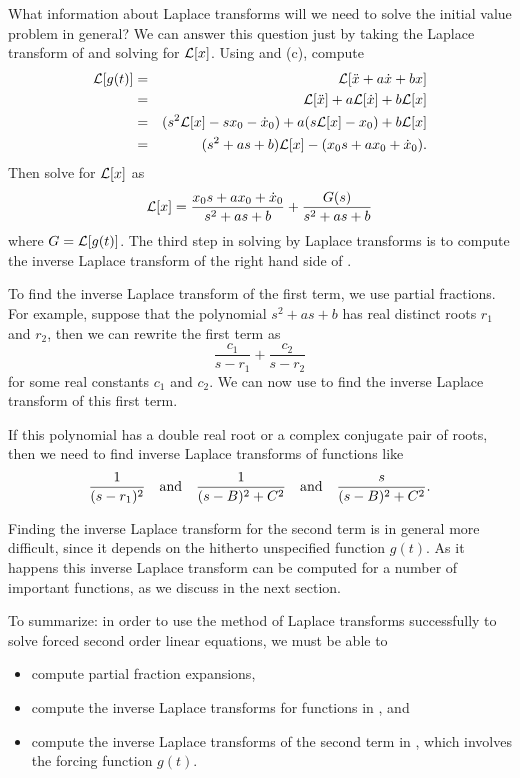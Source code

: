 \documentclass{ximera}
\begin{document}
What information about Laplace transforms will we need to solve the 
initial value problem  in general?  We can answer this 
question just by taking the Laplace transform of  and 
solving for ${\cal L}[x]$.  Using  and (c), 
compute 
\begin{eqnarray*}
{\cal L}[g(t)] & = & {\cal L}[\ddot{x}+a\dot{x} + bx] \\
& = & {\cal L}[\ddot{x}] + a{\cal L}[\dot{x}]+b {\cal L}[x] \\ 
& = & (s^2{\cal L}[x]-sx_0-\dot{x}_0) +a(s{\cal L}[x]-x_0)+b{\cal L}[x]\\
& = & (s^2+as+b){\cal L}[x]-(x_0s+ax_0+\dot{x}_0).
\end{eqnarray*}
Then solve for ${\cal L}[x]$ as
\begin{equation}  \label{e:laplace2nd}
{\cal L}[x] = \frac{x_0s + ax_0+\dot{x}_0}{s^2+as+b} + \frac{G(s)}{s^2+as+b}
\end{equation}
where $G = {\cal L}[g(t)]$.  The third step in solving 
by Laplace transforms is to compute the inverse Laplace transform
 of the right hand side of 
.  

To find the inverse Laplace transform of the first term, we use partial 
fractions.  For example, suppose that the polynomial $s^2+as+b$ 
has real distinct roots $r_1$ and $r_2$, then we can rewrite the first 
term as 
\[
\frac{c_1}{s-r_1} + \frac{c_2}{s-r_2}
\]
for some real constants $c_1$ and $c_2$.  We can now use 
to find the inverse Laplace transform of this first term.  

If this polynomial has a double real root or a complex conjugate pair of 
roots, then we need to find inverse Laplace transforms of functions like
\begin{equation}  \label{e:sampleLT}
\frac{1}{(s-r_1)^2}  \quad\mbox{and}\quad \frac{1}{(s-B)^2+C^2} \quad\mbox{and}\quad \frac{s}{(s-B)^2+C^2}.
\end{equation}

Finding the inverse Laplace transform for the second term is in general 
more difficult, since it depends on the hitherto unspecified function $g(t)$.
As it happens this inverse Laplace transform can be computed for a number 
of important functions, as we discuss in the next section.

To summarize: in order to use the method of Laplace transforms successfully
to solve forced second order linear equations, we must be able to
\begin{itemize}
\item	compute partial fraction expansions,
\item	compute the inverse Laplace transforms
 for functions in , and
\item   compute the inverse Laplace transforms of the second term in 
, which involves the forcing function $g(t)$.
\end{itemize}
\end{document}
